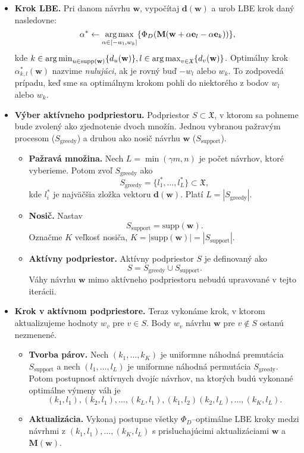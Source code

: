 \begin{itemize}
	\item \textbf{Krok LBE.} Pri danom návrhu $\mathbf w$, vypočítaj $\mathbf {d(w)}$ a urob LBE krok daný nasledovne: $$\alpha^* \leftarrow \operatorname*{arg\,max}_{\alpha \in [-w_l, w_k] } \{ \Phi_D(\mathbf M(\mathbf w+\alpha \mathbf e_l -\alpha \mathbf e_k)) \},$$ kde 
	$k \in \operatorname*{arg\,min}_{u \in \text{supp}(\mathbf w)} \{ d_u(\mathbf w)\}, l \in \operatorname*{arg\,max}_{v \in \mathfrak X} \{ d_v(\mathbf w)\}$. Optimálny krok $\alpha^*_{k,l}(\mathbf w)$ nazvime \textit{nulujúci}, ak je rovný buď $-w_l$ alebo $w_k$. To zodpovedá prípadu, keď sme sa optimálnym krokom pohli do niektorého z bodov $w_l$ alebo $w_k$.

	\item \textbf{Výber aktívneho podpriestoru.} Podpriestor $S \subset \mathfrak X$, v ktorom sa pohneme bude zvolený ako zjednotenie dvoch množín. Jednou vybranou pažravým procesom ($S_\text{greedy}$) a druhou ako nosič návrhu $\mathbf w$ ($S_\text{support}$).
	\begin{itemize}
		\item \textbf{Pažravá množina.} Nech $L=\min (\gamma m, n)$ je počet návrhov, ktoré vyberieme. Potom zvoľ $S_\text{greedy}$ ako $$S_\text{greedy} = \{l_1^*, \dots, l_L^* \} \subset \mathfrak X,$$ kde $l_i^*$ je najväčšia zložka vektoru $\mathbf d(\mathbf w)$. Platí $L=|S_\text{greedy}|$.
		\item \textbf{Nosič.} Nastav $$S_\text{support}=\text{supp}(\mathbf w).$$ Označme $K$ veľkosť nosiča, $K= |\text{supp}(\mathbf w)|=|S_\text{support}|$.
		\item \textbf{Aktívny podpriestor.} Aktívny podpriestor $S$ je definovaný ako $$S=S_\text{greedy} \cup S_\text{support}.$$ Váhy návrhu $\mathbf w$ mimo aktívneho podpriestoru nebudú upravované v tejto iterácii.
	\end{itemize}

	\item \textbf{Krok v aktívnom podpriestore.} Teraz vykonáme krok, v ktorom aktualizujeme hodnoty $w_v$ pre $v \in S$. Body $w_v$ návrhu $\mathbf w$ pre $v \not \in S$ ostanú nezmenené.
	\begin{itemize}
		\item \textbf{Tvorba párov.} Nech $(k_1, \dots, k_K)$ je uniformne náhodná premutácia $S_\text{support}$ a nech $(l_1, \dots, l_L)$ je uniformne náhodná permutácia $S_\text{greedy}$. Potom postupnosť aktívnych dvojíc návrhov, na ktorých budú vykonané optimálne výmeny váh je $$ (k_1,l_1), (k_2, l_1), \dots, (k_L, l_1), (k_1, l_2) (k_2,l_L), \dots, (k_K, l_L). $$
		\item \textbf{Aktualizácia.} Vykonaj postupne všetky $\Phi_D$--optimálne LBE kroky medzi návrhmi z $ (k_1,l_1), \dots, (k_K, l_L)$ s prisluchajúcimi aktualizáciami $\mathbf w$ a $\mathbf {M(w)}$.
	\end{itemize}
\end{itemize}


